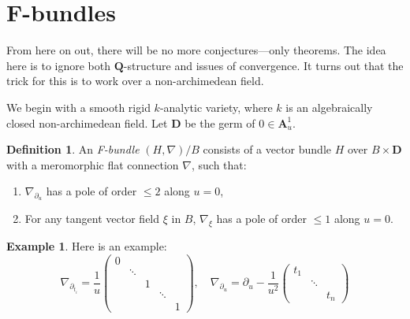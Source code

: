\documentclass[11pt, reqno]{amsart}
\numberwithin{equation}{section}
\theoremstyle{plain}
\theoremstyle{definition}
\newtheorem{definition}[theorem]{Definition}
\newtheorem{example}[theorem]{Example}
\theoremstyle{italicsname}
\newcommand{\bA}{\mathbf{A}}
\newcommand{\bD}{\mathbf{D}}
\newcommand{\bQ}{\mathbf{Q}}
\begin{document}


\section{F-bundles} %
\label{sec:f_bundles}

From here on out, there will be no more conjectures---only theorems. The idea here is to ignore both $\bQ$-structure and issues of convergence. It turns out that the trick for this is to work over a non-archimedean field. 

We begin with a smooth rigid $k$-analytic variety, where $k$ is an algebraically closed non-archimedean field. Let $\bD$ be the germ of $0 \in \bA^1_u$.

\begin{definition}
\label{def:f_bundle}
    An \emph{F-bundle} $(H, \nabla)/B$ consists of a vector bundle $H$ over $B \times \bD$ with a meromorphic flat connection $\nabla$, such that:
    \begin{enumerate} [label = (\arabic*)]
         \item $\nabla_{\partial_u}$ has a pole of order $\leq 2$ along $u = 0$,
         \item For any tangent vector field $\xi$ in $B$, $\nabla_{\xi}$ has a pole of order $\leq 1$ along $u = 0$.
     \end{enumerate} 
\end{definition}

\begin{example}
Here is an example:
    \begin{equation*}
        \nabla_{\partial_{t_i}} = \frac{1}{u} \begin{pmatrix}
            0 \\
            & \ddots \\
            & & 1 \\
            & & & \ddots \\
            & & & & 1
        \end{pmatrix}, \quad \nabla_{\partial_u} = \partial_u - \frac{1}{u^2} \begin{pmatrix}
            t_1 \\
            & \ddots \\
            & & t_n
        \end{pmatrix}
    \end{equation*}
\end{example}
\end{document}
